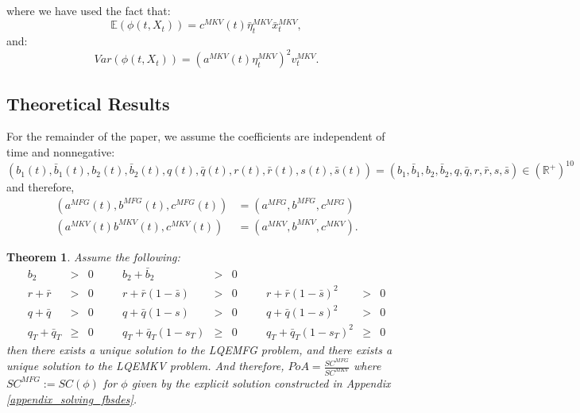 \documentclass[11pt]{article}
\newtheorem{theorem}{Theorem}
\begin{document}
where we have used the fact that:
\begin{equation*}
    \mathbb{E}(\phi(t,X_t))=c^{MKV}(t)\bar{\eta}_t^{MKV}\bar{x}_t^{MKV},
\end{equation*}
and:
\begin{equation*}
    Var(\phi(t,X_t))=(a^{MKV}(t)\eta_t^{MKV})^2v^{MKV}_t.
\end{equation*}

\subsection{\textbf{Theoretical Results}}
For the remainder of the paper, we assume the coefficients are independent of time and nonnegative:
\begin{equation*}
    (b_1(t), \bar{b}_1(t),b_2(t),\bar{b}_2(t),q(t),\bar{q}(t),r(t),\bar{r}(t),s(t),\bar{s}(t))=(b_1,\bar{b}_1,b_2,\bar{b}_2,q,\bar{q},r,\bar{r},s,\bar{s})\in (\mathbb{R}^+)^{10}
\end{equation*}
and therefore,
\begin{equation*}
\begin{split}
    (a^{MFG}(t),b^{MFG}(t),c^{MFG}(t))&=(a^{MFG},b^{MFG},c^{MFG}) \\
    (a^{MKV}(t) b^{MKV}(t),c^{MKV}(t))&=(a^{MKV},b^{MKV},c^{MKV}).
\end{split}
\end{equation*}

\begin{theorem} \label{th:exist_uniq}
Assume the following:
\begin{equation}
\begin{array}{rclcrclcrcl}
    b_2 &>& 0 & & b_2 + \bar{b}_2 &>& 0 & & \\
    r+\bar{r} &>&0 &&  r+\bar{r}(1-\bar{s}) &>&0 & & r+\bar{r}(1-\bar{s})^2 &>& 0 \\
    q+\bar{q} &>& 0 && q + \bar{q}(1-s) &>& 0 & & q+ \bar{q}(1-s)^2 &>& 0 \\
    q_T + \bar{q}_T &\geq& 0 & \quad & q_T + \bar{q}_T(1-s_T) &\geq& 0 & \quad & q_T + \bar{q}_T(1-s_T)^2 &\geq& 0
\end{array}
\label{eq:assumptions}
\end{equation}
then there exists a unique solution to the LQEMFG problem, and there exists a unique solution to the LQEMKV problem. And therefore, $PoA=\frac{SC^{MFG}}{SC^{MKV}}$ where $SC^{MFG}:=SC(\phi)$ for $\phi$ given by the explicit solution constructed in Appendix \ref{appendix_solving_fbsdes}.
\end{theorem}
\end{document}
